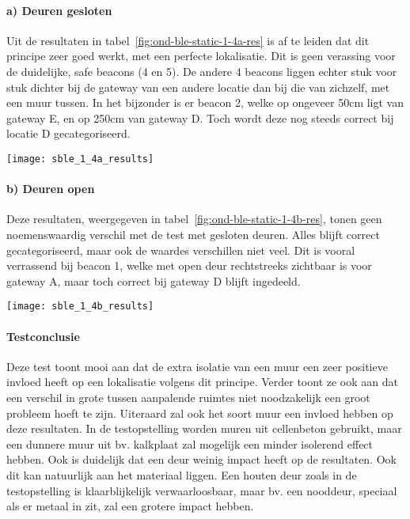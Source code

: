 \paragraph{a) Deuren gesloten}
\begin{minipage}{0.55\textwidth}
Uit de resultaten in tabel~\ref{fig:ond-ble-static-1-4a-res} is af te leiden dat dit principe zeer goed werkt, met een perfecte lokalisatie. Dit is geen verassing voor de duidelijke, safe beacons (4 en 5). De andere 4 beacons liggen echter stuk voor stuk dichter bij de gateway van een andere locatie dan bij die van zichzelf, met een muur tussen. In het bijzonder is er beacon 2, welke op ongeveer 50cm ligt van gateway E, en op 250cm van gateway D. Toch wordt deze nog steeds correct bij locatie D gecategoriseerd.
\end{minipage}
\hfill
\begin{minipage}{0.42\textwidth}
	\texttt{[image: sble\_1\_4a\_results]}
	\label{fig:ond-ble-static-1-4a-res}
\end{minipage}

\paragraph{b) Deuren open}
\begin{minipage}{0.55\textwidth}
Deze resultaten, weergegeven in tabel~\ref{fig:ond-ble-static-1-4b-res}, tonen geen noemenswaardig verschil met de test met gesloten deuren. Alles blijft correct gecategoriseerd, maar ook de waardes verschillen niet veel. Dit is vooral verrassend bij beacon 1, welke met open deur rechtstreeks zichtbaar is voor gateway A, maar toch correct bij gateway D blijft ingedeeld.
\end{minipage}
\hfill
\begin{minipage}{0.42\textwidth}
	\texttt{[image: sble\_1\_4b\_results]}
	\label{fig:ond-ble-static-1-4b-res}
\end{minipage}

\paragraph{Testconclusie}
Deze test toont mooi aan dat de extra isolatie van een muur een zeer positieve invloed heeft op een lokalisatie volgens dit principe. Verder toont ze ook aan dat een verschil in grote tussen aanpalende ruimtes niet noodzakelijk een groot probleem hoeft te zijn. Uiteraard zal ook het soort muur een invloed hebben op deze resultaten. In de testopstelling worden muren uit cellenbeton gebruikt, maar een dunnere muur uit bv. kalkplaat zal mogelijk een minder isolerend effect hebben. Ook is duidelijk dat een deur weinig impact heeft op de resultaten. Ook dit kan natuurlijk aan het materiaal liggen. Een houten deur zoals in de testopstelling is klaarblijkelijk verwaarloosbaar, maar bv. een nooddeur, speciaal als er metaal in zit, zal een grotere impact hebben.


